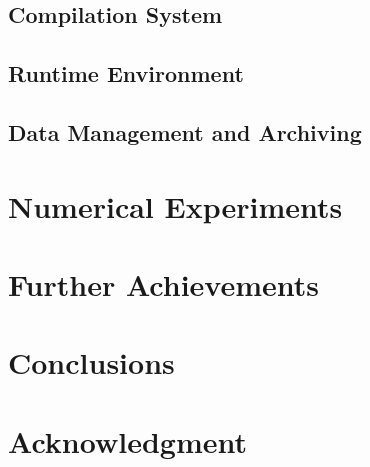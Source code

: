 \documentclass[10pt,conference]{IEEEtran}
\begin{document}
\subsection{Compilation System}

\subsection{Runtime Environment}

\subsection{Data Management and Archiving}

\section{Numerical Experiments}
\label{sec:experiment}

\section{Further Achievements}
\label{sec:futureworks}

\section{Conclusions}
\label{sec:conclusion}

\section*{Acknowledgment}


%

\end{document}
